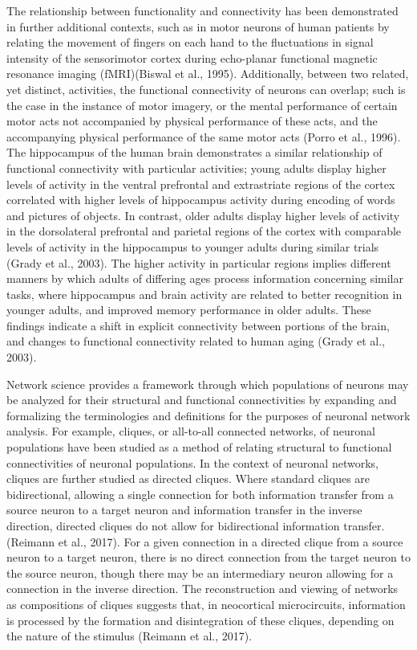 \documentclass[11pt]{article}
\begin{document}
The relationship between functionality and connectivity has been demonstrated in further additional contexts, such as in motor neurons of human patients by relating the movement of fingers on each hand to the fluctuations in signal intensity of the sensorimotor cortex during echo-planar functional magnetic resonance imaging (fMRI)(Biswal et al., 1995). Additionally, between two related, yet distinct, activities, the functional connectivity of neurons can overlap; such is the case in the instance of motor imagery, or the mental performance of certain motor acts not accompanied by physical performance of these acts, and the accompanying physical performance of the same motor acts (Porro et al., 1996). The hippocampus of the human brain demonstrates a similar relationship of functional connectivity with particular activities; young adults display higher levels of activity in the ventral prefrontal and extrastriate regions of the cortex correlated with higher levels of hippocampus activity during  encoding of words and pictures of objects. In contrast, older adults display higher levels of activity in the dorsolateral prefrontal and parietal regions of the cortex with comparable levels of activity in the hippocampus to younger adults during similar trials (Grady et al., 2003). The higher activity in particular regions implies different manners by which adults of differing ages process information concerning similar tasks, where hippocampus and brain activity are related to better recognition in younger adults, and improved memory performance in older adults. These findings indicate a shift in explicit connectivity between portions of the brain, and changes to functional connectivity related to human aging (Grady et al., 2003).\par

Network science provides a framework through which populations of neurons may be analyzed for their structural and functional connectivities by expanding and formalizing the terminologies and definitions for the purposes of neuronal network analysis. For example, cliques, or all-to-all connected networks, of neuronal populations have been studied as a method of relating structural to functional connectivities of neuronal populations. In the context of neuronal networks, cliques are further studied as directed cliques. Where standard cliques are bidirectional, allowing a single connection for both information transfer from a source neuron to a target neuron and information transfer in the inverse direction, directed cliques do not allow for bidirectional information transfer. (Reimann et al., 2017). For a given connection in a directed clique from a source neuron to a target neuron, there is no direct connection from the target neuron to the source neuron, though there may be an intermediary neuron allowing for a connection in the inverse direction. The reconstruction and viewing of networks as compositions of cliques suggests that, in neocortical microcircuits, information is processed by the formation and disintegration of these cliques, depending on the nature of the stimulus (Reimann et al., 2017).\par
\end{document}
